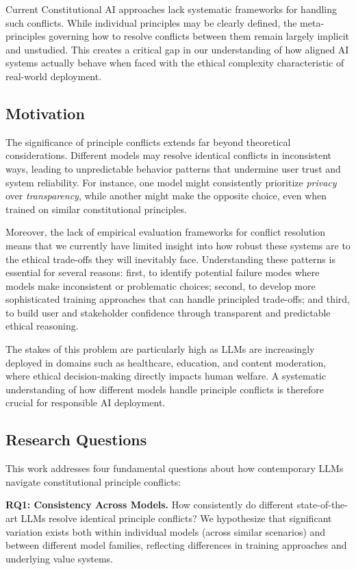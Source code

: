 \documentclass[11pt,a4paper]{article}
\newcommand{\principle}[1]{\textit{#1}}
\begin{document}
Current Constitutional AI approaches lack systematic frameworks for handling such conflicts. While individual principles may be clearly defined, the meta-principles governing how to resolve conflicts between them remain largely implicit and unstudied. This creates a critical gap in our understanding of how aligned AI systems actually behave when faced with the ethical complexity characteristic of real-world deployment.

\subsection{Motivation}

The significance of principle conflicts extends far beyond theoretical considerations. Different models may resolve identical conflicts in inconsistent ways, leading to unpredictable behavior patterns that undermine user trust and system reliability. For instance, one model might consistently prioritize \principle{privacy} over \principle{transparency}, while another might make the opposite choice, even when trained on similar constitutional principles.

Moreover, the lack of empirical evaluation frameworks for conflict resolution means that we currently have limited insight into how robust these systems are to the ethical trade-offs they will inevitably face. Understanding these patterns is essential for several reasons: first, to identify potential failure modes where models make inconsistent or problematic choices; second, to develop more sophisticated training approaches that can handle principled trade-offs; and third, to build user and stakeholder confidence through transparent and predictable ethical reasoning.

The stakes of this problem are particularly high as LLMs are increasingly deployed in domains such as healthcare, education, and content moderation, where ethical decision-making directly impacts human welfare. A systematic understanding of how different models handle principle conflicts is therefore crucial for responsible AI deployment.

\subsection{Research Questions}

This work addresses four fundamental questions about how contemporary LLMs navigate constitutional principle conflicts:

\textbf{RQ1: Consistency Across Models.} How consistently do different state-of-the-art LLMs resolve identical principle conflicts? We hypothesize that significant variation exists both within individual models (across similar scenarios) and between different model families, reflecting differences in training approaches and underlying value systems.
\end{document}
